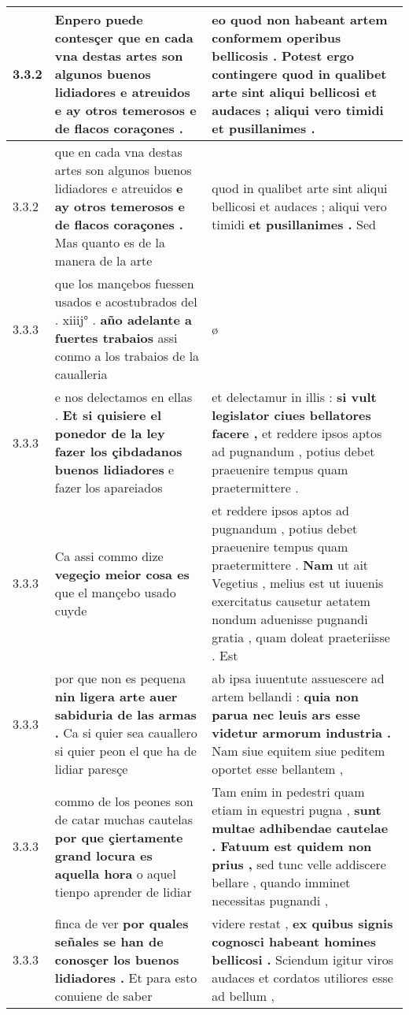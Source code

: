 \begin{tabular}{|p{1cm}|p{6.5cm}|p{6.5cm}|}
3.3.2 & Enpero puede contesçer \textbf{ que en cada vna destas artes son algunos buenos lidiadores e atreuidos } e ay otros temerosos e de flacos coraçones . & eo quod non habeant artem conformem operibus bellicosis . Potest ergo contingere \textbf{ quod in qualibet arte sint aliqui bellicosi et audaces ; aliqui vero timidi } et pusillanimes . \\\hline
3.3.2 & que en cada vna destas artes son algunos buenos lidiadores e atreuidos \textbf{ e ay otros temerosos e de flacos coraçones . } Mas quanto es de la manera de la arte & quod in qualibet arte sint aliqui bellicosi et audaces ; aliqui vero timidi \textbf{ et pusillanimes . } Sed \\\hline
3.3.3 & que los mançebos fuessen usados e acostubrados del . xiiij° . \textbf{ año adelante a fuertes trabaios } assi conmo a los trabaios de la caualleria & ø \\\hline
3.3.3 & e nos delectamos en ellas . \textbf{ Et si quisiere el ponedor de la ley fazer los çibdadanos buenos lidiadores } e fazer los apareiados & et delectamur in illis : \textbf{ si vult legislator ciues bellatores facere , } et reddere ipsos aptos ad pugnandum , potius debet praeuenire tempus quam praetermittere . \\\hline
3.3.3 & Ca assi commo dize \textbf{ vegeçio meior cosa es } que el mançebo usado cuyde & et reddere ipsos aptos ad pugnandum , potius debet praeuenire tempus quam praetermittere . \textbf{ Nam } ut ait Vegetius , melius est ut iuuenis exercitatus causetur aetatem nondum aduenisse pugnandi gratia , quam doleat praeteriisse . Est \\\hline
3.3.3 & por que non es pequena \textbf{ nin ligera arte auer sabiduria de las armas . } Ca si quier sea cauallero si quier peon el que ha de lidiar paresçe & ab ipsa iuuentute assuescere ad artem bellandi : \textbf{ quia non parua nec leuis ars esse videtur armorum industria . } Nam siue equitem siue peditem oportet esse bellantem , \\\hline
3.3.3 & commo de los peones son de catar muchas cautelas \textbf{ por que çiertamente grand locura es aquella hora } o aquel tienpo aprender de lidiar & Tam enim in pedestri quam etiam in equestri pugna , \textbf{ sunt multae adhibendae cautelae . Fatuum est quidem non prius , } sed tunc velle addiscere bellare , quando imminet necessitas pugnandi , \\\hline
3.3.3 & finca de ver \textbf{ por quales señales se han de conosçer los buenos lidiadores . } Et para esto conuiene de saber & videre restat , \textbf{ ex quibus signis cognosci habeant homines bellicosi . } Sciendum igitur viros audaces et cordatos utiliores esse ad bellum , \\\hline

\end{tabular}
